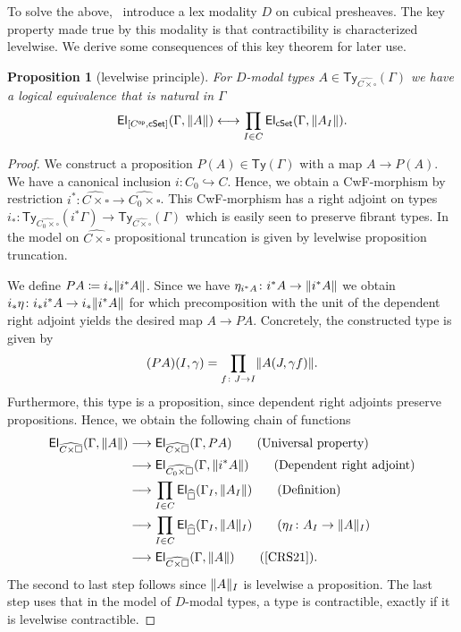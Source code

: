 \documentclass[10pt,a4paper]{article}
\newtheorem{proposition}{Proposition}[section]
\newcommand{\cSet}{\mathsf{cSet}}
\DeclareMathOperator\op{\mathsf{op}}
\newcommand\Ty{\mathsf{Ty}}
\newcommand\El{\mathsf{El}}
\begin{document}
To solve the above,~\cite{CRS21} introduce a lex modality \(D\) on cubical presheaves.
The key property made true by this modality is that contractibility is characterized levelwise.
We derive some consequences of this key theorem for later use.

\begin{proposition}[levelwise principle]\label{prop:levelwise-principle}
  For $D$-modal types $A \in \Ty_{\widehat{C \times \square}}(\Gamma)$ we have a logical equivalence that is natural in $\Gamma$
  \[
    \El_{[C^{\op}, \cSet]}(\Gamma, \trunc{ A }) \longleftrightarrow \prod_{I \in C} \El_{\cSet}(\Gamma, \trunc{A_I}).
  \]
\end{proposition}
\begin{proof}
  We construct a proposition $P(A) \in \Ty(\Gamma)$ with a map $A \to P(A)$.
  We have a canonical inclusion $i \colon C_0 \hookrightarrow C$.
  Hence, we obtain a CwF-morphism by restriction $i^* \colon \widehat{C \times \square} \to \widehat{C_0 \times \square}$.
  This CwF-morphism has a right adjoint on types $i_* \colon \Ty_{\widehat{C_0 \times \square}}(i^*\Gamma) \to \Ty_{\widehat{C \times \square}}(\Gamma)$ which is easily seen to preserve fibrant types.
  In the model on $\widehat{C \times \square}$ propositional truncation is given by levelwise proposition truncation.

  We define $PA \coloneqq i_*\trunc{i^*A}$.
  Since we have $\eta_{i^*A} \colon i^* A \to \trunc{i^*A}$ we obtain $i_*\eta \colon i_*i^*A \to i_*\trunc{i^*A}$ for which precomposition with the unit of the dependent right adjoint yields the desired map $A \to PA$.
  Concretely, the constructed type is given by
  \[
    (PA)(I, \gamma) = \prod_{f \colon J \to I} \trunc{A(J, \gamma f)}.
  \]
  Furthermore, this type is a proposition, since dependent right adjoints preserve propositions.
  Hence, we obtain the following chain of functions
  \begin{align*}
    \El_{\widehat{C \times \square}}(\Gamma, \trunc{A})
    &\longrightarrow \El_{\widehat{C \times \square}}(\Gamma, PA) \tag{Universal property} \\
    &\longrightarrow \El_{\widehat{C_0 \times \square}}(\Gamma, \trunc{i^*A}) \tag{Dependent right adjoint} \\
    &\longrightarrow \prod_{I \in C} \El_{\widehat\square}(\Gamma_I, \trunc{A_I}) \tag{Definition} \\
    &\longrightarrow \prod_{I \in C} \El_{\widehat{\square}}(\Gamma_I, \trunc{A}_I) \tag{$\eta_I \colon A_I \to \trunc{A}_I$}  \\
    &\longrightarrow \El_{\widehat{C \times \square}}(\Gamma, \trunc{A}) \tag{\cite[Proposition~16]{CRS21}}.
  \end{align*}
  The second to last step follows since $\trunc{A}_I$ is levelwise a proposition.
  The last step uses that in the model of $D$-modal types, a type is contractible, exactly if it is levelwise contractible.
\end{proof}
\end{document}
